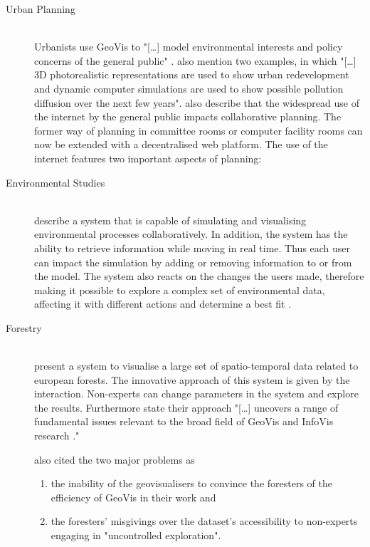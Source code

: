 \begin{description}

\item[Urban Planning] \hfill \\
Urbanists use \ac{GeoVis} to "[\ldots] model environmental interests and policy concerns of the general public" . \citeauthor{Jiang2003} also mention two examples, in which "[\ldots] 3D photorealistic representations are used to show urban redevelopment and dynamic computer simulations are used to show possible pollution diffusion over the next few years".
\citeauthor{Jiang2003} also describe that the widespread use of the internet by the general public impacts collaborative planning. The former way of planning in committee rooms or computer facility rooms can now be extended with a decentralised web platform. The use of the internet features two important aspects of planning:

\item[Environmental Studies] \hfill \\
\citeauthor{Danado2005} describe a system that is capable of simulating and visualising environmental processes collaboratively. In addition, the system has the ability to retrieve information while moving in real time. Thus each user can impact the simulation by adding or removing information to or from the model. The system also reacts on the changes the users made, therefore making it possible to explore a complex set of environmental data, affecting it with different actions and determine a best fit .

\item[Forestry] \hfill \\
\citeauthor{Andrienko2007} present a system to visualise a large set of spatio-temporal data related to european forests. The innovative approach of this system is given by the interaction. Non-experts can change parameters in the system and explore the results. Furthermore \citeauthor{Andrienko2007} state their approach "[\ldots] uncovers a range of fundamental issues relevant to the broad field of \ac{GeoVis} and \ac{InfoVis} research ."

\citeauthor{Andrienko2007} also cited the two major problems as
\begin{enumerate}
\item the inability of the geovisualisers to convince the foresters of the efficiency of \ac{GeoVis} in their work and
\item the foresters' misgivings over the dataset's accessibility to non-experts engaging in "uncontrolled exploration".
\end{enumerate}


\end{description}
